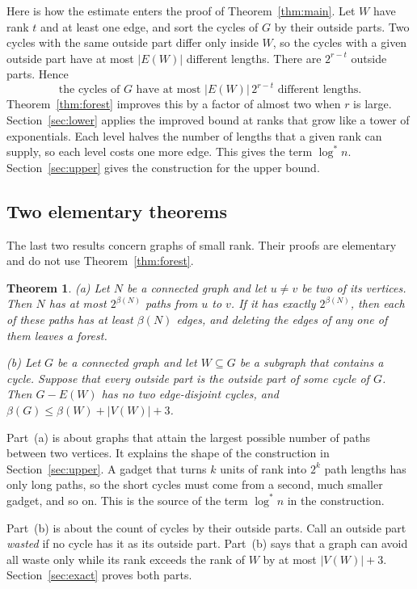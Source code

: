 \documentclass[11pt]{article}
\newtheorem{theorem}{Theorem}[section]
\theoremstyle{definition}
\theoremstyle{remark}
\newcommand{\lgs}{\log^{*}}
\numberwithin{equation}{section}
\begin{document}
Here is how the estimate enters the proof of Theorem~\ref{thm:main}. Let $W$ have rank $t$ and at
least one edge, and sort the cycles of $G$ by their outside parts. Two cycles with the same outside
part differ only inside $W$, so the cycles with a given outside part have at most $|E(W)|$
different lengths. There are $2^{r-t}$ outside parts. Hence
\begin{equation}\label{eq:trivial}
  \text{the cycles of $G$ have at most }|E(W)|\,2^{r-t}\text{ different lengths.}
\end{equation}
Theorem~\ref{thm:forest} improves this by a factor of almost two when $r$ is large.
Section~\ref{sec:lower} applies the improved bound at ranks that grow like a tower of exponentials.
Each level halves the number of lengths that a given rank can supply, so each level costs one more
edge. This gives the term $\lgs n$. Section~\ref{sec:upper} gives the construction for the upper
bound.

\subsection{Two elementary theorems}

The last two results concern graphs of small rank. Their proofs are elementary and do not use
Theorem~\ref{thm:forest}.

\begin{theorem}\label{thm:exact}
\textup{(a)} Let $N$ be a connected graph and let $u\ne v$ be two of its vertices. Then $N$ has at
most $2^{\beta(N)}$ paths from $u$ to $v$. If it has exactly $2^{\beta(N)}$, then each of these paths
has at least $\beta(N)$ edges, and deleting the edges of any one of them leaves a forest.

\textup{(b)} Let $G$ be a connected graph and let $W\subseteq G$ be a subgraph that contains a cycle.
Suppose that every outside part is the outside part of some cycle of $G$. Then $G-E(W)$ has no two
edge-disjoint cycles, and $\beta(G)\le\beta(W)+|V(W)|+3$.
\end{theorem}

Part~(a) is about graphs that attain the largest possible number of paths between two vertices. It
explains the shape of the construction in Section~\ref{sec:upper}. A gadget that turns $k$ units of
rank into $2^{k}$ path lengths has only long paths, so the short cycles must come from a second,
much smaller gadget, and so on. This is the source of the term $\lgs n$ in the construction.

Part~(b) is about the count of cycles by their outside parts. Call an outside part \emph{wasted} if
no cycle has it as its outside part. Part~(b) says that a graph can avoid all waste only while its
rank exceeds the rank of $W$ by at most $|V(W)|+3$. Section~\ref{sec:exact} proves both parts.
\end{document}
